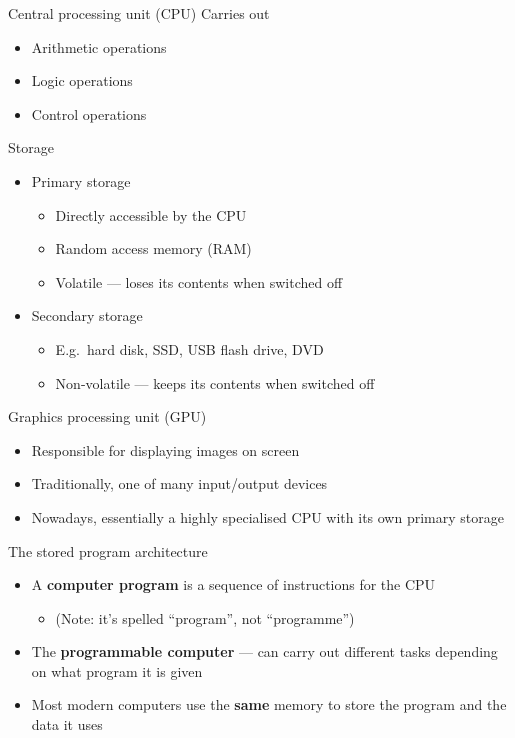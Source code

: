 \begin{frame}{Central processing unit (CPU)}
	\pause Carries out
	\begin{itemize}
		\pause \item Arithmetic operations
		\pause \item Logic operations
		\pause \item Control operations
	\end{itemize}
\end{frame}

\begin{frame}{Storage}
	\begin{itemize}
		\pause \item Primary storage
			\begin{itemize}
				\pause \item Directly accessible by the CPU
				\pause \item Random access memory (RAM)
				\pause \item Volatile --- loses its contents when switched off
			\end{itemize}
		\pause \item Secondary storage
			\begin{itemize}
				\pause \item E.g.\ hard disk, SSD, USB flash drive, DVD
				\pause \item Non-volatile --- keeps its contents when switched off
			\end{itemize}
	\end{itemize}
\end{frame}

\begin{frame}{Graphics processing unit (GPU)}
	\begin{itemize}
		\pause \item Responsible for displaying images on screen
		\pause \item Traditionally, one of many input/output devices
		\pause \item Nowadays, essentially a highly specialised CPU with its own primary storage
	\end{itemize}
\end{frame}

\begin{frame}{The stored program architecture}
	\begin{itemize}
		\pause \item A \textbf{computer program} is a sequence of instructions for the CPU
			\begin{itemize}
				\pause \item (Note: it's spelled ``program'', not ``programme'')
			\end{itemize}
		\pause \item The \textbf{programmable computer} --- can carry out different tasks depending on what program it is given
		\pause \item Most modern computers use the \textbf{same} memory to store the program and the data it uses
	\end{itemize}
\end{frame}

